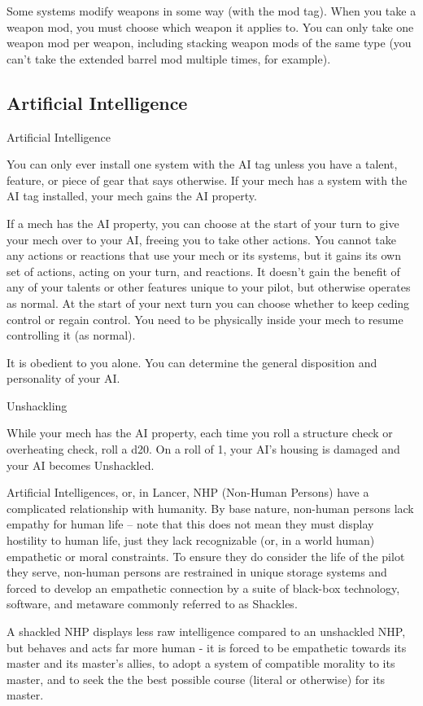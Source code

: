 Some systems modify weapons in some way (with the mod tag). When you take a weapon mod,
you must choose which weapon it applies to. You can only take one weapon mod per weapon,
including stacking weapon mods of the same type (you can’t take the extended barrel mod
multiple times, for example).

\subsection{Artificial Intelligence}
\hypertarget{AI}{Artificial Intelligence}

You can only ever install one system with the AI tag unless you have a talent, feature, or piece
of gear that says otherwise. If your mech has a system with the AI tag installed, your mech gains
the AI property.

If a mech has the AI property, you can choose at the start of your turn to give your mech over to
your AI, freeing you to take other actions. You cannot take any actions or reactions that use your
mech or its systems, but it gains its own set of actions, acting on your turn, and reactions. It
doesn’t gain the benefit of any of your talents or other features unique to your pilot, but
otherwise operates as normal. At the start of your next turn you can choose whether to keep
ceding control or regain control. You need to be physically inside your mech to resume
controlling it (as normal).


It is obedient to you alone. You can determine the general disposition and personality of your AI.

Unshackling

While your mech has the AI property, each time you roll a structure check or overheating
check, roll a d20. On a roll of 1, your AI’s housing is damaged and your AI becomes Unshackled.


Artificial Intelligences, or, in Lancer, NHP (Non-Human Persons) have a complicated relationship
with humanity. By base nature, non-human persons lack empathy for human life -- note that this
does not mean they must display hostility to human life, just they lack recognizable (or, in a world
human) empathetic or moral constraints. To ensure they do consider the life of the pilot they
serve, non-human persons are restrained in unique storage systems and forced to develop an
empathetic connection by a suite of black-box technology, software, and metaware commonly
referred to as Shackles.


A shackled NHP displays less raw intelligence compared to an unshackled NHP, but behaves
and acts far more human - it is forced to be empathetic towards its master and its master’s allies,
to adopt a system of compatible morality to its master, and to seek the the best possible course
(literal or otherwise) for its master.


